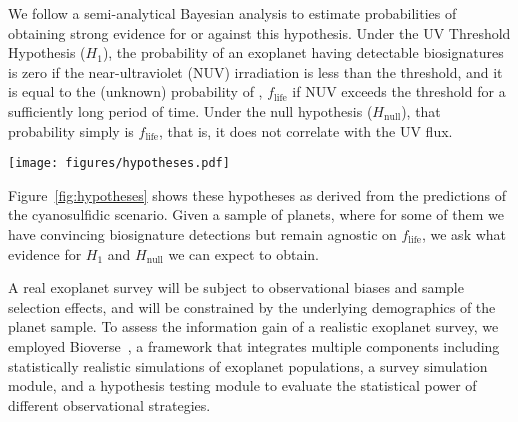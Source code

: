 \documentclass[twocolumn,twocolappendix,linenumbers]{aastex631}
\begin{document}
We follow a semi-analytical Bayesian analysis to estimate probabilities of obtaining strong evidence for or against this hypothesis.
Under the UV Threshold Hypothesis ($H_1$), the probability of an exoplanet having detectable biosignatures is zero if the near-ultraviolet (\gls{NUV}) irradiation is less than the threshold, and it is equal to the (unknown) probability of , $f_\mathrm{life}$ if \gls{NUV} exceeds the threshold for a sufficiently long period of time.
Under the null hypothesis ($H_\mathrm{null}$), that probability simply is $f_\mathrm{life}$, that is, it does not correlate with the \gls{UV} flux.
\begin{figure*}
    \begin{centering}
        \texttt{[image: figures/hypotheses.pdf]}
        \caption{UV~Threshold Hypothesis and null hypothesis derived from the cyanosulfidic scenario.}
        \label{fig:hypotheses}
    \end{centering}
\end{figure*}
Figure~\ref{fig:hypotheses} shows these hypotheses as derived from the predictions of the cyanosulfidic scenario.
Given a sample of planets, where for some of them we have convincing biosignature detections but remain agnostic on $f_\mathrm{life}$, we ask what evidence for $H_1$ and $H_\mathrm{null}$ we can expect to obtain.

A real exoplanet survey will be subject to observational biases and sample selection effects, and will be constrained by the underlying demographics of the planet sample.
To assess the information gain of a realistic exoplanet survey, we employed Bioverse~\citep{Bixel2021,Hardegree-Ullman2023,Schlecker2024,Hardegree-Ullman2024}, a framework that integrates multiple components including statistically realistic simulations of exoplanet populations, a survey simulation module, and a hypothesis testing module to evaluate the statistical power of different observational strategies.

\end{document}
